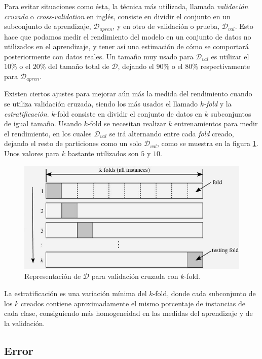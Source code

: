Para evitar situaciones como ésta, la técnica más utilizada, llamada \emph{validación cruzada} o \emph{cross-validation} en inglés, consiste en dividir el conjunto en un subconjunto de aprendizaje, $\mathcal{D}_{apren}$, y en otro de validación o prueba, $\mathcal{D}_{val}$. Esto hace que podamos medir el rendimiento del modelo en un conjunto de datos no utilizados en el aprendizaje, y tener así una estimación de cómo se comportará posteriormente con datos reales. Un tamaño muy usado para $\mathcal{D}_{val}$ es utilizar el $10\%$ o el $20\%$ del tamaño total de $\mathcal{D}$, dejando el $90\%$ o el $80\%$ respectivamente para $\mathcal{D}_{apren}$.

Existen ciertos ajustes para mejorar aún más la medida del rendimiento cuando se utiliza validación cruzada, siendo los más usados el llamado \emph{$k$-fold} y la \emph{estratificación}. $k$-fold consiste en dividir el conjunto de datos en $k$ subconjuntos de igual tamaño. Usando $k$-fold se necesitan realizar $k$ entrenamientos para medir el rendimiento, en los cuales $\mathcal{D}_{val}$ se irá alternando entre cada \emph{fold} creado, dejando el resto de particiones como un solo $\mathcal{D}_{val}$, como se muestra en la figura \ref{fig:3.7}. Unos valores para $k$ bastante utilizados son $5$ y $10$.

\begin{figure}[H]
  \centering
  \includegraphics[width=120mm]{figures/ch_03/k_fold_example.jpg}
  \caption{Representación de $\mathcal{D}$ para validación cruzada con $k$-fold. \cite{ekroth2012intro}}
  \label{fig:3.7}
\end{figure}

La estratificación es una variación mínima del $k$-fold, donde cada subconjunto de los $k$ creados contiene aproximadamente el mismo porcentaje de instancias de cada clase, consiguiendo más homogeneidad en las medidas del aprendizaje y de la validación.

\subsection{Error} \label{subsec:3.2.3}


